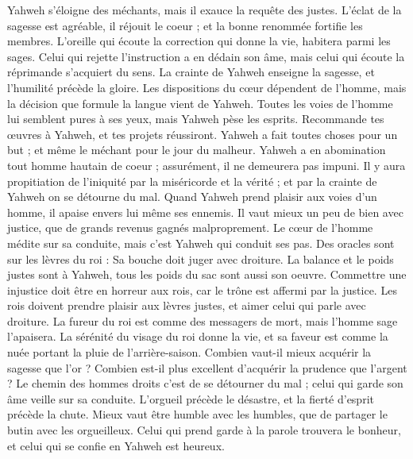\begin{multicols}{2}
Yahweh s’éloigne des méchants, mais il exauce la requête des justes.
L’éclat de la sagesse est agréable, il réjouit le coeur ; et la bonne renommée fortifie les membres.
L'oreille qui écoute la correction qui donne la vie, habitera parmi les sages.
Celui qui rejette l'instruction a en dédain son âme, mais celui qui écoute la réprimande s'acquiert du sens.
La crainte de Yahweh enseigne la sagesse, et l'humilité précède la gloire.
\VerseOne{}Les dispositions du cœur dépendent de l'homme, mais la décision que formule la langue vient de Yahweh.
Toutes les voies de l'homme lui semblent pures à ses yeux, mais Yahweh pèse les esprits.
Recommande tes œuvres à Yahweh, et tes projets réussiront.
Yahweh a fait toutes choses pour un but ; et même le méchant pour le jour du malheur.
Yahweh a en abomination tout homme hautain de coeur ; assurément, il ne demeurera pas impuni.
Il y aura propitiation de l'iniquité par la miséricorde et la vérité ; et par la crainte de Yahweh on se détourne du mal.
Quand Yahweh prend plaisir aux voies d'un homme, il apaise envers lui même ses ennemis.
Il vaut mieux un peu de bien avec justice, que de grands revenus gagnés malproprement.
Le cœur de l'homme médite sur sa conduite, mais c’est Yahweh qui conduit ses pas.
Des oracles sont sur les lèvres du roi : Sa bouche doit juger avec droiture.
La balance et le poids justes sont à Yahweh, tous les poids du sac sont aussi son oeuvre.
Commettre une injustice doit être en horreur aux rois, car le trône est affermi par la justice.
Les rois doivent prendre plaisir aux lèvres justes, et aimer celui qui parle avec droiture.
La fureur du roi est comme des messagers de mort, mais l'homme sage l'apaisera.
La sérénité du visage du roi donne la vie, et sa faveur est comme la nuée portant la pluie de l’arrière-saison.
Combien vaut-il mieux acquérir la sagesse que l’or ? Combien est-il plus excellent d'acquérir la prudence que l'argent ?
Le chemin des hommes droits c'est de se détourner du mal ; celui qui garde son âme veille sur sa conduite.
L'orgueil précède le désastre, et la fierté d'esprit précède la chute.
Mieux vaut être humble avec les humbles, que de partager le butin avec les orgueilleux.
Celui qui prend garde à la parole trouvera le bonheur, et celui qui se confie en Yahweh est heureux.

\end{multicols}
